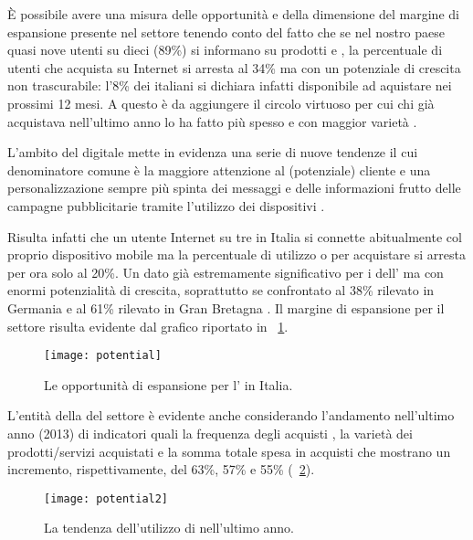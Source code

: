 È possibile avere una misura delle opportunità e della dimensione del margine di espansione presente nel settore tenendo conto del fatto che se nel nostro paese quasi nove utenti su dieci (89\%) si informano  su prodotti e , la percentuale di utenti che acquista su Internet si  arresta al 34\% ma con un potenziale di crescita non trascurabile: l'8\% dei  italiani si dichiara infatti disponibile ad aquistare  nei prossimi 12 mesi. A questo è da aggiungere il circolo virtuoso per
cui chi già acquistava nell’ultimo anno lo ha fatto più spesso e con maggior varietà \cite[\textit{pag.~3}]{contactlab:ecommerce}.

L'ambito del \mktg digitale mette in evidenza una serie di nuove tendenze il cui denominatore comune è la maggiore attenzione al (potenziale) cliente e una personalizzazione sempre più spinta dei messaggi e delle informazioni frutto delle campagne pubblicitarie tramite l'utilizzo dei dispositivi .

Risulta infatti che un utente Internet su tre in Italia si connette abitualmente col proprio dispositivo mobile ma la percentuale di utilizzo  o  per acquistare  si arresta per ora solo al 20\%. Un dato già estremamente significativo per i  dell' ma con enormi potenzialità di crescita, soprattutto se confrontato al 38\% rilevato in Germania e al 61\% rilevato in Gran Bretagna \cite{contactlab:ecommerce}. Il margine di espansione per il settore risulta evidente dal grafico riportato in \figurename~\ref{fig:potential}.

\begin{figure}[H]
  \centering
  \caption{Le opportunità di espansione per l' in Italia.}
  \label{fig:potential}
  \texttt{[image: potential]}
\end{figure}

L'entità della  del settore è evidente anche considerando l'andamento nell'ultimo anno (2013) di indicatori quali la frequenza degli acquisti , la varietà dei prodotti/servizi acquistati e la somma totale spesa in acquisti  che mostrano un incremento, rispettivamente, del 63\%, 57\% e 55\% (\figurename~\ref{fig:potential2}).

\begin{figure}[H]
  \centering
  \texttt{[image: potential2]}
  \caption{La tendenza dell'utilizzo di  nell'ultimo anno.}
  \label{fig:potential2}
\end{figure}

